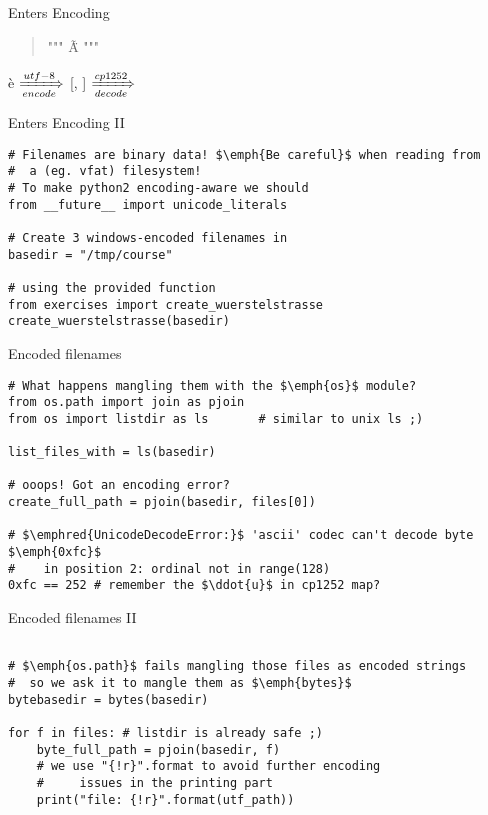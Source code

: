 \begin{frame}[fragile]{Enters Encoding}
\begin{verse}
\begin{center}
"""
\Huge{\~{A}\"{ }}
"""
\end{center}
\end{verse}
\`{e} $\xRightarrow[encode]{utf-8}$ [, ] 
    $\xRightarrow[decode]{cp1252}$  \blue{\"{ }}
\end{frame}

\begin{frame}[fragile]{Enters Encoding II}
\begin{verbatim}
# Filenames are binary data! $\emph{Be careful}$ when reading from
#  a (eg. vfat) filesystem!
# To make python2 encoding-aware we should
from __future__ import unicode_literals

# Create 3 windows-encoded filenames in 
basedir = "/tmp/course"

# using the provided function
from exercises import create_wuerstelstrasse
create_wuerstelstrasse(basedir)
\end{verbatim}
\end{frame}



\begin{frame}[fragile]{Encoded filenames}
\begin{verbatim}
# What happens mangling them with the $\emph{os}$ module?
from os.path import join as pjoin
from os import listdir as ls       # similar to unix ls ;)

list_files_with = ls(basedir)

# ooops! Got an encoding error?
create_full_path = pjoin(basedir, files[0])

# $\emphred{UnicodeDecodeError:}$ 'ascii' codec can't decode byte $\emph{0xfc}$
#    in position 2: ordinal not in range(128)
0xfc == 252 # remember the $\ddot{u}$ in cp1252 map? 
\end{verbatim}
\end{frame}

\begin{frame}[fragile]{Encoded filenames II}
\begin{verbatim}

# $\emph{os.path}$ fails mangling those files as encoded strings
#  so we ask it to mangle them as $\emph{bytes}$
bytebasedir = bytes(basedir)

for f in files: # listdir is already safe ;)
    byte_full_path = pjoin(basedir, f)
    # we use "{!r}".format to avoid further encoding
    #     issues in the printing part
    print("file: {!r}".format(utf_path))
    
\end{verbatim}
\end{frame}

